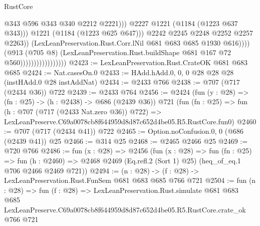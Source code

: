 \begin{lexlean}{RustCore}
\begin{coremodule}
                                                      @343
                                                      @596
                                                      @343
                                                      @340
                                                      @2212
                                                      @2221)))
                                                @2227
                                                @1221
                                                (@1184 (@1223 @637 @343)))
                                              @1221
                                              (@1184 (@1223 @625 @647)))
                                            @2242
                                            @2245
                                            @2248
                                            @2252
                                            @2257
                                            @2263))
                                        (LexLeanPreservation.Rust.Corr.lNil
                                          @681
                                          @683
                                          @685
                                          @1930
                                          @616))))
                                  (@913
                                    (@705 @8)
                                    (LexLeanPreservation.Rust.buildShape
                                      @681
                                      @167
                                      @72
                                      @560)))))))))))))))))
@2423 := LexLeanPreservation.Rust.CrateOK @681 @683 @685
@2424 := Nat.casesOn.{0}
@2433 := HAdd.hAdd.{0, 0, 0} @28 @28 @28 (instHAdd.{0} @28 instAddNat)
@2434 := @2433 @766
@2438 := @707 (@717 (@2434 @36)) @722
@2439 := @2433 @764
@2456 := @2424
    (fun (y : @28) => (fn : @25) -> (h : @2438) -> @686 (@2439 @36))
    @721
    (fun (fn : @25) =>
    fun (h : @707 (@717 (@2433 Nat.zero @36)) @722) =>
    LexLeanPreserve.C69a0078cb8f644959d8d87c652d4be05.R5.RustCore.fun0)
@2460 := @707 (@717 (@2434 @41)) @722
@2465 := Option.noConfusion.{0, 0} (@686 (@2439 @41)) @25
@2466 := @314 @25
@2468 := @2465 @2466 @25
@2469 := @720 @766
@2486 := fun (x : @28) =>
  @2456
    (fun (x : @28) =>
    fun (fn : @25) =>
    fun (h : @2460) => @2468 @2469 (Eq.refl.{2} (Sort 1) @25) (heq_of_eq.{1} @706 @2466 @2469 @721))
@2494 := (n : @28) -> (f : @28) -> LexLeanPreservation.Rust.FunSem @681 @683 @685 @766 @721
@2504 := fun (n : @28) =>
  fun (f : @28) =>
  LexLeanPreservation.Rust.simulate
    @681
    @683
    @685
    LexLeanPreserve.C69a0078cb8f644959d8d87c652d4be05.R5.RustCore.crate_ok
    @766
    @721
\end{coremodule}
\end{lexlean}
